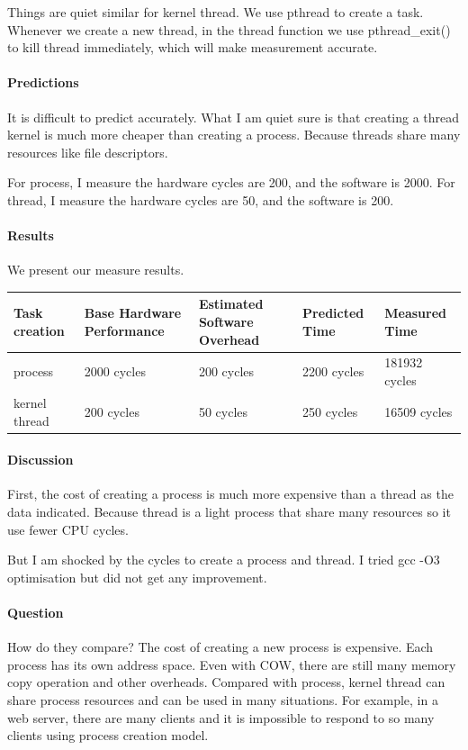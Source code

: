 Things are quiet similar for kernel thread. We use pthread to create a task. Whenever we create a new thread, in the thread function we use pthread\_exit() to kill thread immediately, which will make measurement accurate.

\paragraph{Predictions}
It is difficult to predict accurately. What I am quiet sure is that creating a thread kernel is much more cheaper than creating a process. Because threads share many resources like file descriptors.

For process, I measure the hardware cycles are 200, and the software is 2000.
For thread, I measure the hardware cycles are 50, and the software is 200.

\paragraph{Results}
We present our measure results.

\begin{center}
\begin{tabular}{| p{3cm} | p{3cm} | p{3cm} | p{3cm} | p{3cm} |}
Task creation  & Base Hardware Performance  & Estimated Software Overhead  & Predicted Time  & Measured Time   \\
\hline
process & 2000 cycles& 200 cycles& 2200 cycles& 181932  cycles\\
kernel thread    & 200 cycles& 50 cycles& 250 cycles& 16509 cycles\\
\end{tabular}
\end{center}

\paragraph{Discussion}
First, the cost of creating a process is much more expensive than a thread as the data indicated. Because thread is a light process that share many resources so it use fewer CPU cycles.

But I am shocked by the cycles to create a process and thread. I tried gcc -O3 optimisation but did not get any improvement.

\paragraph{Question} How do they compare?
The cost of creating a new process is expensive. Each process has its own address space. Even with COW, there are still many memory copy operation and other overheads. Compared with process, kernel thread can share process resources and can be used in many situations. For example, in a web server, there are many clients and it is impossible to respond to so many clients using process creation model.

